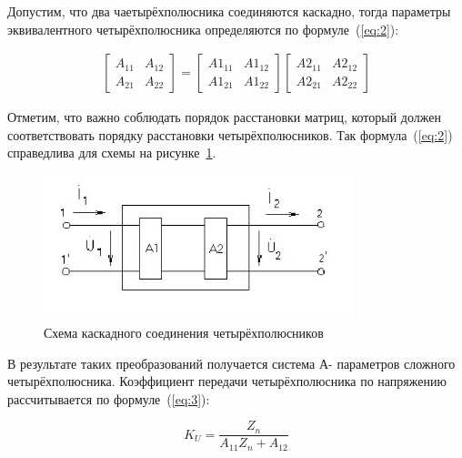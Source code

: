 Допустим, что два чаетырёхполюсника соединяются каскадно, тогда параметры эквивалентного четырёхполюсника определяются по формуле~(\ref{eq:2}): 

\begin{equation}
\label{eq:2}
\begin{aligned}
\begin{bmatrix} A_{11} & A_{12}\\ A_{21} & A_{22} \end{bmatrix} = \begin{bmatrix} A1_{11} & A1_{12}\\ A1_{21} & A1_{22} \end{bmatrix} \begin{bmatrix} A2_{11} & A2_{12}\\ A2_{21} & A2_{22} \end{bmatrix}
\end{aligned}
\end{equation}





Отметим, что важно соблюдать порядок расстановки матриц, который должен  соответствовать  порядку  расстановки  четырёхполюсников.  Так формула~(\ref{eq:2}) справедлива для схемы на рисунке~\ref{p:RIs002}. 

\begin{figure}[H] \centering
  \includegraphics[width=0.8\textwidth]{./content/RIs002.jpg}
  \caption{Схема каскадного соединения четырёхполюсников} \label{p:RIs002}
\end{figure}






В  результате  таких  преобразований  получается  система  А- параметров  сложного  четырёхполюсника.  Коэффициент  передачи четырёхполюсника по напряжению рассчитывается по формуле~(\ref{eq:3}): 

\begin{equation}
\label{eq:3}
K_{U} = \frac{Z_{n}}{A_{11}Z_{n} + A_{12}}
\end{equation}

